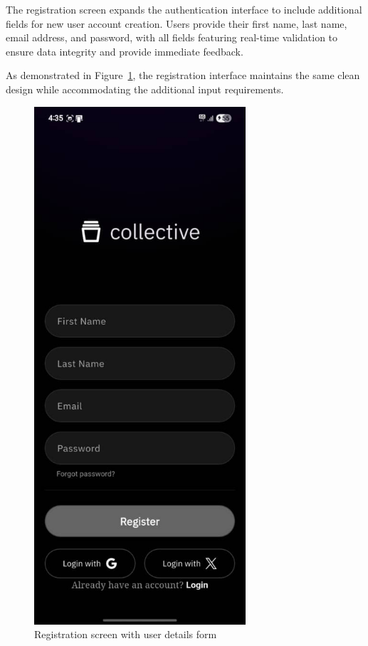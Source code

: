 The registration screen expands the authentication interface to include additional fields for new user account creation. Users provide their first name, last name, email address, and password, with all fields featuring real-time validation to ensure data integrity and provide immediate feedback.

As demonstrated in Figure~\ref{fig:registration-screen}, the registration interface maintains the same clean design while accommodating the additional input requirements.

 \begin{figure}[H]
 \centering
 \includegraphics[width=0.7\textwidth]{files/imgs/prototype/auth_register.jpeg}
 \caption{Registration screen with user details form}
 \label{fig:registration-screen}
 \end{figure}

